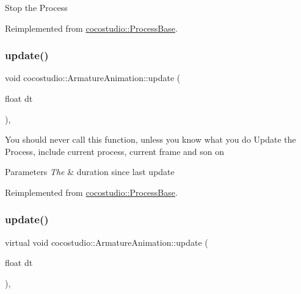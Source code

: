 Stop the Process 

Reimplemented from \hyperlink{classcocostudio_1_1ProcessBase_a1bc5907ac5300d031f2a3ab6d1ed2718}{cocostudio\+::\+Process\+Base}.

\mbox{\label{classcocostudio_1_1ArmatureAnimation_aec1d25a2b9221801e29782b05eb44f42}} 
\subsubsection{\texorpdfstring{update()}{update()}\hspace{0.1cm}{\footnotesize\ttfamily [1/2]}}
{\footnotesize\ttfamily void cocostudio\+::\+Armature\+Animation\+::update (\begin{DoxyParamCaption}\item[{float}]{dt }\end{DoxyParamCaption})\hspace{0.3cm}{\ttfamily [override]}, {\ttfamily [virtual]}}

You should never call this function, unless you know what you do Update the Process, include current process, current frame and son on


\begin{DoxyParams}{Parameters}
{\em The} & duration since last update \\
\hline
\end{DoxyParams}


Reimplemented from \hyperlink{classcocostudio_1_1ProcessBase_acd596d27542d92de41e3435add6f7399}{cocostudio\+::\+Process\+Base}.

\mbox{\label{classcocostudio_1_1ArmatureAnimation_a6ae1a77029ac2fe5663d2b997f54b245}} 
\subsubsection{\texorpdfstring{update()}{update()}\hspace{0.1cm}{\footnotesize\ttfamily [2/2]}}
{\footnotesize\ttfamily virtual void cocostudio\+::\+Armature\+Animation\+::update (\begin{DoxyParamCaption}\item[{float}]{dt }\end{DoxyParamCaption})\hspace{0.3cm}{\ttfamily [override]}, {\ttfamily [virtual]}}

